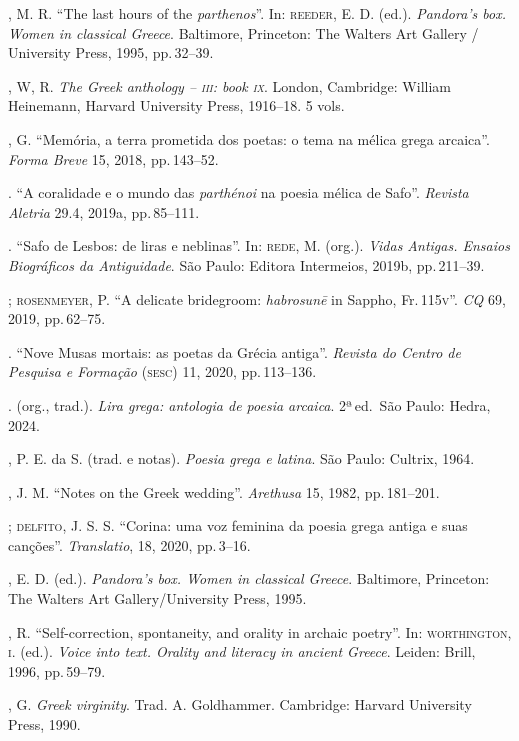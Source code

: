 \begin{bibliohedra}
, M. R. “The last hours of the \emph{parthenos}”. In: \textsc{reeder}, E. D. (ed.). \emph{Pandora’s box. Women in classical Greece}. Baltimore, Princeton: The Walters Art Gallery / University Press, 1995, pp.\,32--39. 

, W, R. \emph{The Greek anthology -- \textsc{iii}: book \textsc{ix}}. London, Cambridge: William Heinemann, Harvard University Press, 1916--18. 5 vols.

, G. “Memória, a terra prometida dos poetas: o tema na mélica grega arcaica”. \emph{Forma Breve} 15, 2018, pp.\,143--52. 

\titidem. “A coralidade e o mundo das \emph{parthénoi} na poesia mélica de Safo”. \emph{Revista Aletria} 29.4, 2019a, pp.\,85--111. 

\titidem. “Safo de Lesbos: de liras e neblinas”. In: \textsc{rede}, M. (org.). \emph{Vidas Antigas. Ensaios Biográficos da Antiguidade}. São Paulo: Editora Intermeios, 2019b, pp.\,211--39.

\titidem; \textsc{rosenmeyer}, P. “A delicate bridegroom: \emph{habrosunē} in Sappho, Fr.\,115\textsc{v}”. \emph{CQ} 69, 2019, pp.\,62--75.

\titidem. ``Nove Musas mortais: as poetas da Grécia antiga''. \emph{Revista do Centro de Pesquisa e Formação} (\textsc{sesc}) 11, 2020, pp.\,113--136.

\titidem. (org., trad.). \emph{Lira grega: antologia de poesia arcaica}. 2ª\,ed.\, São Paulo: Hedra, 2024.

, P. E. da S. (trad. e notas). \emph{Poesia grega e latina}. São Paulo: Cultrix, 1964.

, J. M. “Notes on the Greek wedding”. \emph{Arethusa} 15, 1982, pp.\,181--201. 

\titidem; \textsc{delfito}, J. S. S. “Corina: uma voz feminina da poesia grega antiga e suas canções”. \emph{Translatio},  18, 2020, pp.\,3--16.

, E. D. (ed.). \emph{Pandora’s box. Women in classical Greece}. Baltimore, Princeton: The Walters Art Gallery/University Press, 1995.


, R. “Self-correction, spontaneity, and orality in archaic poetry”. In: \textsc{worthington}, \textsc{i}. (ed.). \emph{Voice into text. Orality and literacy in ancient Greece}. Leiden: Brill, 1996, pp.\,59--79.

, G. \emph{Greek virginity}. Trad. A. Goldhammer. Cambridge: Harvard University Press, 1990.


\end{bibliohedra}
